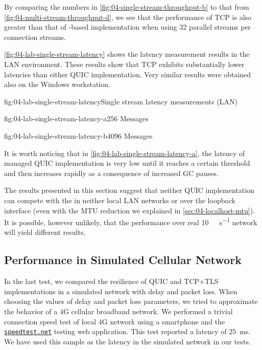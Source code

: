 By comparing the numbers in \autoref{fig:04-single-stream-throughput-b} to that from
\autoref{fig:04-multi-stream-throughput-d}, we see that the performance of TCP is also greater than
that of \libmsquic{}-based implementation when using 32 parallel streams per connection streams.

\autoref{fig:04-lab-single-stream-latency} shows the latency measurement results in the LAN
environment. These results show that TCP exhibits substantially lower latencies than either QUIC
implementation. Very similar results were obtained also on the Windows workstation.

\begin{myFigure}{fig:04-lab-single-stream-latency}{Single stream latency measurements (LAN)}
\begin{mySubfigure}{0.49\linewidth}{fig:04-lab-single-stream-latency-a}{\SI{256}{\byte} Messages}
\footnotesize

\end{mySubfigure}
\begin{mySubfigure}{0.49\linewidth}{fig:04-lab-single-stream-latency-b}{\SI{4096}{\byte} Messages}
\footnotesize

\end{mySubfigure}
\end{myFigure}

It is worth noticing that in \autoref{fig:04-lab-single-stream-latency-a}, the latency of managed QUIC
implementation is very low until it reaches a certain threshold and then increases rapidly as a
consequence of increased GC pauses.

The results presented in this section suggest that neither QUIC implementation can compete with the
\SslStream{} in neither local LAN networks or over the loopback interface (even with the MTU
reduction we explained in \autoref{sec:04-localhost-mtu}). It is possible, however unlikely, that
the performance over real \SI[per-mode=symbol]{10}{\giga\bit\per\second} network will yield
different results.

\subsection{Performance in Simulated Cellular Network}

In the last test, we compared the resilience of QUIC and TCP+TLS implementations in a simulated
network with delay and packet loss. When choosing the values of delay and packet loss parameters, we
tried to approximate the behavior of a 4G cellular broadband network. We performed a trivial
connection speed test of local 4G network using a smartphone and the
\href{https://speedtest.net}{\texttt{speedtest.net}} testing web application. This test reported a
latency of \SI{25}{\milli\second}. We have used this sample as the latency in the simulated network
in our tests.

